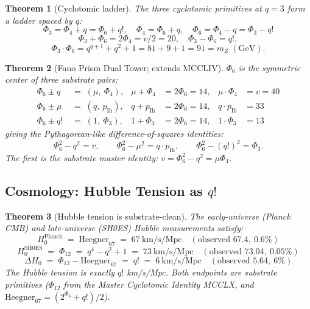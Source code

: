 \documentclass[11pt]{article}
\newtheorem{theorem}{Theorem}[section]
\begin{document}
\begin{theorem}[Cyclotomic ladder]\label{thm:cyclotomic}
The three cyclotomic primitives at $q = 3$ form a ladder spaced by $q$:
\[
  \Phi_3 = \Phi_4 + q = \Phi_6 + q!,
  \quad \Phi_4 = \Phi_6 + q,
  \quad \Phi_6 = \Phi_4 - q = \Phi_3 - q!
\]
\[
  \Phi_3 + \Phi_6 = 2\Phi_4 = v/2 = 20, \quad
  \Phi_3 - \Phi_6 = q!,
\]
\[
  \Phi_3 \cdot \Phi_6 = q^{q+1} + q^2 + 1 = 81 + 9 + 1 = 91 = m_Z\;(\text{GeV}).
\]
\end{theorem}

\begin{theorem}[Fano Prism Dual Tower; extends MCCLIV]\label{thm:fano_prism_dual}
$\Phi_6$ is the symmetric center of three substrate pairs:
\begin{align*}
  \Phi_6 \pm q  &\;=\; (\mu,\ \Phi_4),  & \mu + \Phi_4 &= 2\Phi_6 = 14, & \mu \cdot \Phi_4 &= v = 40 \\
  \Phi_6 \pm \mu &\;=\; (q,\ p_{\mathrm{Ih}}), & q + p_{\mathrm{Ih}} &= 2\Phi_6 = 14, & q \cdot p_{\mathrm{Ih}} &= 33 \\
  \Phi_6 \pm q! &\;=\; (1,\ \Phi_3), & 1 + \Phi_3 &= 2\Phi_6 = 14, & 1 \cdot \Phi_3 &= 13
\end{align*}
giving the Pythagorean-like difference-of-squares identities:
\[
  \Phi_6^2 - q^2 = v, \qquad
  \Phi_6^2 - \mu^2 = q\cdot p_{\mathrm{Ih}}, \qquad
  \Phi_6^2 - (q!)^2 = \Phi_3.
\]
The first is the substrate master identity: $v = \Phi_6^2 - q^2 = \mu\Phi_4$.
\end{theorem}

\subsection{Cosmology: Hubble Tension as $q!$}

\begin{theorem}[Hubble tension is substrate-clean]\label{thm:hubble_tension}
The early-universe (Planck CMB) and late-universe (SH0ES) Hubble
measurements satisfy:
\[
  H_0^{\mathrm{Planck}} \;=\; \mathrm{Heegner}_{67} \;=\; 67~\mathrm{km/s/Mpc}
  \quad (\text{observed } 67.4,\ 0.6\%)
\]
\[
  H_0^{\mathrm{SH0ES}}  \;=\; \Phi_{12} \;=\; q^4 - q^2 + 1 \;=\; 73~\mathrm{km/s/Mpc}
  \quad (\text{observed } 73.04,\ 0.05\%)
\]
\[
  \Delta H_0 \;=\; \Phi_{12} - \mathrm{Heegner}_{67} \;=\; q! \;=\; 6~\mathrm{km/s/Mpc}
  \quad (\text{observed } 5.64,\ 6\%)
\]
The Hubble tension is exactly $q!$ km/s/Mpc.  Both endpoints are
substrate primitives ($\Phi_{12}$ from the Master Cyclotomic Identity
MCCLX, and $\mathrm{Heegner}_{67} = (2^{\Phi_6}+q!)/2$).
\end{theorem}
\end{document}
